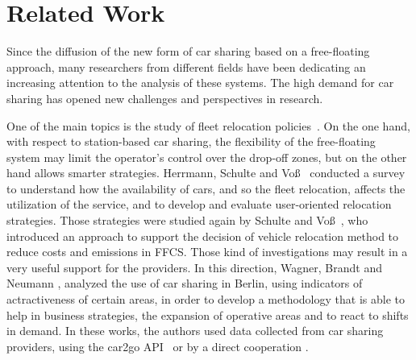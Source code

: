 \section{Related Work}
\label{sec:3_2_related}
Since the diffusion of the new form of car sharing based on a free-floating approach, many researchers from different fields have been dedicating an increasing attention to the analysis of these systems.
The high demand for car sharing has opened new challenges and perspectives in research.

One of the main topics is the study of fleet relocation policies~\cite{Herrmann2014,Schulte2015,Wagner2015}. On the one hand, with respect to station-based car sharing, the flexibility of the free-floating system may limit the operator's control over the drop-off zones, but on the other hand allows smarter strategies. 
Herrmann, Schulte and Voß~\cite{Herrmann2014} conducted a survey to understand how the availability of cars, and so the fleet relocation, affects the utilization of the service, and to develop and evaluate user-oriented relocation strategies.
Those strategies were studied again by Schulte and Voß~\cite{Schulte2015}, who introduced an approach to support the decision of vehicle relocation method to reduce costs and emissions in FFCS.
Those kind of investigations may result in a very useful support for the providers. In this direction, Wagner, Brandt and Neumann \cite{Wagner2015}, analyzed the use of car sharing in Berlin, using indicators of actractiveness of certain areas, in order to develop a methodology that is able to help in business strategies, the expansion of operative areas and to react to shifts in demand. In these works, the authors used data collected from car sharing providers, using the car2go API~\cite{Herrmann2014,Schulte2015} or by a direct cooperation \cite{Wagner2015}.

